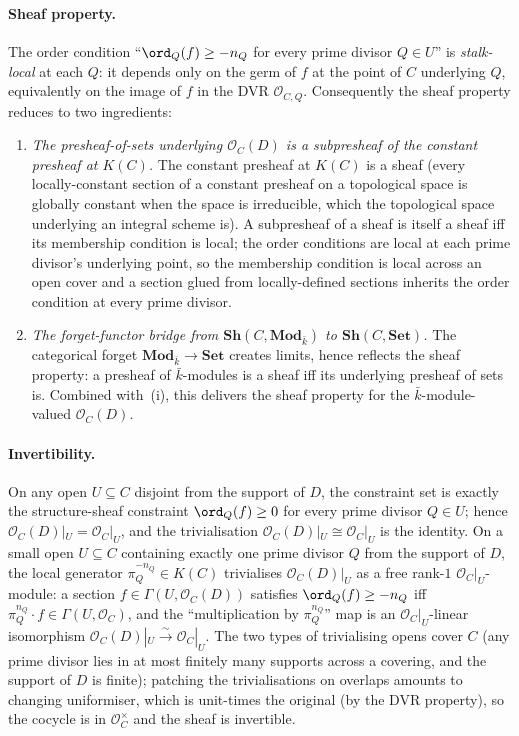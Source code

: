 \paragraph{Sheaf property.} The order condition
``\(\ord_Q(f) \geq -n_Q\) for every prime divisor \(Q \in U\)'' is
\emph{stalk-local} at each \(Q\): it depends only on the germ of \(f\) at
the point of \(C\) underlying \(Q\), equivalently on the image of \(f\) in
the DVR \(\mathcal O_{C, Q}\). Consequently the sheaf property reduces
to two ingredients:
\begin{enumerate}
  \item \emph{The presheaf-of-sets underlying \(\mathcal O_C(D)\) is a
    subpresheaf of the constant presheaf at \(K(C)\).} The constant
    presheaf at \(K(C)\) is a sheaf (every locally-constant section of a
    constant presheaf on a topological space is globally constant when
    the space is irreducible, which the topological space underlying an
    integral scheme is). A subpresheaf of a sheaf is itself a sheaf iff
    its membership condition is local; the order conditions are local
    at each prime divisor's underlying point, so the membership
    condition is local across an open cover and a section glued from
    locally-defined sections inherits the order condition at every
    prime divisor.
  \item \emph{The forget-functor bridge from
    \(\mathbf{Sh}(C, \mathbf{Mod}_{\bar k})\) to
    \(\mathbf{Sh}(C, \mathbf{Set})\).} The categorical forget
    \(\mathbf{Mod}_{\bar k} \to \mathbf{Set}\) creates limits, hence
    reflects the sheaf property: a presheaf of \(\bar k\)-modules is a
    sheaf iff its underlying presheaf of sets is. Combined with~(i),
    this delivers the sheaf property for the
    \(\bar k\)-module-valued \(\mathcal O_C(D)\).
\end{enumerate}

\paragraph{Invertibility.} On any open \(U \subseteq C\) disjoint from
the support of \(D\), the constraint set is exactly the structure-sheaf
constraint \(\ord_Q(f) \geq 0\) for every prime divisor \(Q \in U\); hence
\(\mathcal O_C(D)|_U = \mathcal O_C|_U\), and the trivialisation
\(\mathcal O_C(D)|_U \cong \mathcal O_C|_U\) is the identity. On a small
open \(U \subseteq C\) containing exactly one prime divisor \(Q\) from the
support of \(D\), the local generator \(\pi_Q^{-n_Q} \in K(C)\) trivialises
\(\mathcal O_C(D)|_U\) as a free rank-\(1\) \(\mathcal O_C|_U\)-module: a
section \(f \in \Gamma(U, \mathcal O_C(D))\) satisfies $\ord_Q(f) \geq
-n_Q$ iff $\pi_Q^{n_Q} \cdot f \in \Gamma(U, \mathcal O_C)$, and the
``multiplication by \(\pi_Q^{n_Q}\)'' map is an
\(\mathcal O_C|_U\)-linear isomorphism
\(\mathcal O_C(D)|_U \xrightarrow{\sim} \mathcal O_C|_U\). The two types
of trivialising opens cover \(C\) (any prime divisor lies in at most
finitely many supports across a covering, and the support of \(D\) is
finite); patching the trivialisations on overlaps amounts to changing
uniformiser, which is unit-times the original (by the DVR property), so
the cocycle is in \(\mathcal O_C^{\times}\) and the sheaf is invertible.

